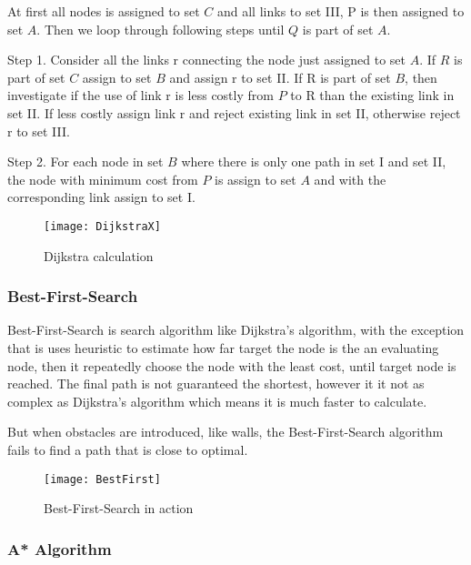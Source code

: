   At first all nodes is assigned to set $C$ and all links to set \RN{3}, P is then assigned to set $A$.
  Then we loop through following steps until $Q$ is part of set $A$.

  Step 1. Consider all the links r connecting the node just assigned to set $A$. If $R$ is part of set $C$ assign to set $B$ and assign r to set \RN{2}. 
  If R is part of set $B$, then investigate if the use of link r is less costly from $P$ to R than the existing link in set \RN{2}. If less costly assign link r and reject existing link in set \RN{2}, otherwise reject r to set \RN{3}.

  Step 2. For each node in set $B$ where there is only one path in set \RN{1} and set \RN{2}, the node with minimum cost from $P$ is assign to set $A$ and with the corresponding link assign to set \RN{1}.

  \begin{figure}[ht!]
    \centering
    \texttt{[image: DijkstraX]}
    \caption{Dijkstra calculation}
    \label{overflow}
  \end{figure}

  \subsubsection{Best-First-Search}

  Best-First-Search is search algorithm like Dijkstra's algorithm, with the exception that is uses heuristic to estimate how far target the node is the an evaluating node, then it repeatedly choose the node with the least cost, until target node is reached.  The final path is not guaranteed the shortest, however it it not as complex as Dijkstra's algorithm which means it is much faster to calculate. \cite{BestFirst}

  But when obstacles are introduced, like walls, the Best-First-Search algorithm fails to find a path that is close to optimal.

  \begin{figure}[ht!]
    \centering
    \texttt{[image: BestFirst]} 
    \caption{Best-First-Search in action}
    \label{bestfirst}
  \end{figure}

  \subsubsection{A* Algorithm}

